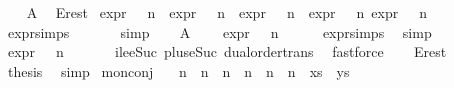 \begin{isabellebody}
%
\isadelimproof
%
\endisadelimproof
%
\isatagproof
{}\isamarkupfalse%
{\isacharminus}{\kern0pt}\isanewline
\ \ \isamarkupfalse%
\ A{}\ \isamarkupfalse%
\ E{\isacharunderscore}{\kern0pt}rest{\isacharcolon}{\kern0pt}\ \isanewline
{\isachardoublequoteopen}expr{\isacharunderscore}{\kern0pt}{}\ {\isasymphi}\ {\isasymle}\ n{}\ {\isasymand}\ expr{\isacharunderscore}{\kern0pt}{}\ {\isasymphi}\ {\isasymle}\ n{}\ {\isasymand}\ expr{\isacharunderscore}{\kern0pt}{}\ {\isasymphi}\ {\isasymle}\ n{}\ {\isasymand}\ expr{\isacharunderscore}{\kern0pt}{}\ {\isasymphi}\ {\isasymle}\ n{}\ {\isasymand}expr{\isacharunderscore}{\kern0pt}{}\ {\isasymphi}\ {\isasymle}\ n{}{\isachardoublequoteclose}\ \isanewline
\ \ \ \ \isamarkupfalse%
\ expr{\isachardot}{\kern0pt}simps\ \isanewline
\ \ \ \ \isamarkupfalse%
\ simp\isanewline
\ \ \isamarkupfalse%
\ A{}\ \isamarkupfalse%
\ {\isachardoublequoteopen}{}\ {\isacharplus}{\kern0pt}\ expr{\isacharunderscore}{\kern0pt}{}\ {\isasymphi}\ {\isasymle}\ n{}{\isachardoublequoteclose}\isanewline
\ \ \ \ \isamarkupfalse%
\ expr{\isacharunderscore}{\kern0pt}{}{\isachardot}{\kern0pt}simps{\isacharparenleft}{\kern0pt}{}{\isacharparenright}{\kern0pt}\ \isamarkupfalse%
\ simp\isanewline
\ \ \isamarkupfalse%
\ {\isachardoublequoteopen}expr{\isacharunderscore}{\kern0pt}{}\ {\isasymphi}\ {\isasymle}\ n{}{\isachardoublequoteclose}\ \isanewline
\ \ \ \ \isamarkupfalse%
\ ile{\isacharunderscore}{\kern0pt}eSuc\ plus{\isacharunderscore}{\kern0pt}{}{\isacharunderscore}{\kern0pt}eSuc{\isacharparenleft}{\kern0pt}{}{\isacharparenright}{\kern0pt}\ dual{\isacharunderscore}{\kern0pt}order{\isachardot}{\kern0pt}trans\ \isamarkupfalse%
\ fastforce\isanewline
\ \ \isamarkupfalse%
\ E{\isacharunderscore}{\kern0pt}rest\ \isamarkupfalse%
\ {\isacharquery}{\kern0pt}thesis\ \isamarkupfalse%
\ simp\isanewline
{}\isamarkupfalse%
%
\endisatagproof
{\isafoldproof}%
%
\isadelimproof
\isanewline
%
\endisadelimproof
\isanewline
{}\isamarkupfalse%
\ mon{\isacharunderscore}{\kern0pt}conj{\isacharcolon}{\kern0pt}\isanewline
\ \ \ n{}\ \ n{}\ \ n{}\ \ n{}\ \ n{}\ \ n{}\ \ xs\ \ ys\isanewline

\end{isabellebody}
